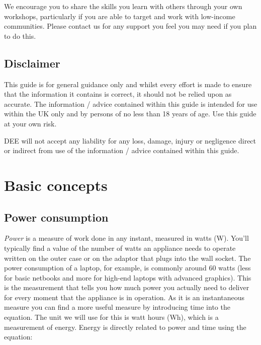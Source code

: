 \documentclass{article}
\theoremstyle{definition}
\theoremstyle{definition}
\theoremstyle{remark}
\begin{document}
    We encourage you to share the skills you learn with others through your own workshops, particularly if you are able to target and work with low-income communities. Please contact us for any support you feel you may need if you plan to do this.


  {\color{blue}\subsection{Disclaimer}} %
  \label{sub:disclaimer}

    This guide is for general guidance only and whilst every effort is made to ensure that the information it contains is correct, it should not be relied upon as accurate. The information / advice contained within this guide is intended for use within the UK only and by persons of no less than 18 years of age. Use this guide at your own risk.

    DEE will not accept any liability for any loss, damage, injury or negligence direct or indirect from use of the information / advice contained within this guide.


  \newpage  


{\color{blue}\section{Basic concepts}} %
\label{sec:basic_concepts}

  {\color{blue}\subsection{Power consumption}} %
  \label{sub:power_consumption}

    \textit{Power} is a measure of  work done in any instant, measured in watts (W). You'll typically find a value of the number of watts an appliance needs to operate written on the outer case or on the adaptor that plugs into the wall socket. The power consumption of a laptop, for example, is commonly around 60 watts (less for basic netbooks and more for high-end laptops with advanced graphics). This is the measurement that tells you how much power you actually need to deliver for every moment that the appliance is in operation. As it is an instantaneous measure you can find a more useful measure by introducing time into the equation. The unit we will use for this is watt hours (Wh), which is a measurement of energy. Energy is directly related to power and time using the equation:
\end{document}
